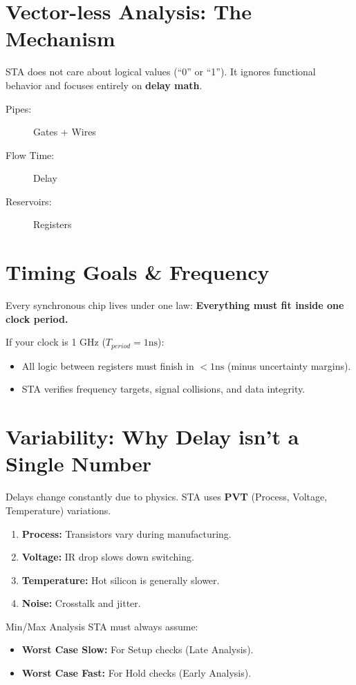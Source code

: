 \documentclass[11pt, a4paper]{article}
\begin{document}
\section{Vector-less Analysis: The Mechanism}

STA does not care about logical values (``0'' or ``1''). It ignores functional behavior and focuses entirely on \textbf{delay math}.

\begin{description}
    \item[Pipes:] Gates + Wires
    \item[Flow Time:] Delay
    \item[Reservoirs:] Registers
\end{description}

\section{Timing Goals \& Frequency}

Every synchronous chip lives under one law: \textbf{Everything must fit inside one clock period.}

If your clock is 1 GHz ($T_{period} = 1\text{ns}$):
\begin{itemize}
    \item All logic between registers must finish in $< 1\text{ns}$ (minus uncertainty margins).
    \item STA verifies frequency targets, signal collisions, and data integrity.
\end{itemize}

\section{Variability: Why Delay isn't a Single Number}

Delays change constantly due to physics. STA uses \textbf{PVT} (Process, Voltage, Temperature) variations.
\begin{enumerate}
    \item \textbf{Process:} Transistors vary during manufacturing.
    \item \textbf{Voltage:} IR drop slows down switching.
    \item \textbf{Temperature:} Hot silicon is generally slower.
    \item \textbf{Noise:} Crosstalk and jitter.
\end{enumerate}

\begin{crucial}{Min/Max Analysis}
STA must always assume:
\begin{itemize}
    \item \textbf{Worst Case Slow:} For Setup checks (Late Analysis).
    \item \textbf{Worst Case Fast:} For Hold checks (Early Analysis).
\end{itemize}
\end{crucial}
\end{document}

